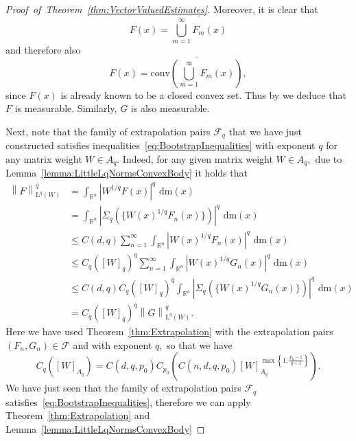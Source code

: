 \documentclass{article}
\theoremstyle{definition}
\theoremstyle{remark}
\numberwithin{equation}{section}
\newcommand{\norm}[2]{\left\|{#1}\right\|_{{#2}}}
\newcommand{\mathdm}{\,\mathrm{dm}}
\newcommand{\cF}{\mathcal{F}}
\newcommand{\reals}{\mathbb{R}}
\newcommand{\Lp}[1]{\mathrm{L}^{#1}}
\newcommand{\1}{\mathbf{1}}
\begin{document}
\begin{proof}[Proof~of~Theorem~\ref{thm:VectorValuedEstimates}]
        Moreover, it is clear that
        \begin{equation*}
            F(x) = \overline{\bigcup_{m=1}^{\infty}F_m(x)}
        \end{equation*}
        and therefore also
        \begin{equation*}
            F(x) = \overline{\mathrm{conv}\left(\bigcup_{m=1}^{\infty}F_{m}(x)\right)},
        \end{equation*}
        since $F(x)$ is already known to be a closed convex set. Thus by \cite[Theorem 8.2.2]{Aubin_2009} we deduce that $F$ is measurable. Similarly, $G$ is also measurable.

        Next, note that the family of extrapolation pairs $\cF_q$ that we have just constructed
        satisfies inequalities~\eqref{eq:BootstrapInequalities} with exponent $q$ for any matrix weight $W \in A_q.$
        Indeed, for any given matrix weight $W \in A_q,$ due to Lemma~\ref{lemma:LittleLqNormsConvexBody} it holds that
        \begin{equation*}
            \begin{split}
                \norm{F}{\Lp{q}(W)}^q &= \int_{\reals^n} |W^{1/q}F(x)|^q\, \mathdm(x)\\
                &= \int_{\reals^n} \left|\Sigma_q (\{W(x)^{1/q} F_n(x)\})\right|^q\, \mathdm(x)\\
                &\leq C(d,q) \sum_{n=1}^\infty \int_{\reals^n} |W(x)^{1/q} F_n(x)|^q\, \mathdm(x)\\
                &\leq C_{q}([W]_q)^q \sum_{n=1}^\infty \int_{\reals^n} |W(x)^{1/q} G_n(x)|^q\, \mathdm(x)\\
                &\leq C(d,q) C_{q}([W]_q)^q \int_{\reals^n} \left|\Sigma_q (\{W(x)^{1/q} G_n(x)\})\right|^q\, \mathdm(x)\\
                &= C_{q}([W]_q)^q \norm{G}{\Lp{q}(W)}^q.
            \end{split}
        \end{equation*}
        Here we have used Theorem~\ref{thm:Extrapolation} with the extrapolation pairs $(F_n,G_n) \in \cF$
        and with exponent $q,$ so that we have
        \begin{equation*}
            C_q([W]_{A_q}) = C(d,q,p_0) C_{p_0}\left(C(n,d,q,p_0) [W]_{A_q}^{\max\left\{1,\frac{p_0-1}{q-1}\right\}}\right).
        \end{equation*}
        We have just seen that the family of extrapolation pairs $\cF_q$ satisfies~\eqref{eq:BootstrapInequalities},
        therefore we can apply Theorem~\ref{thm:Extrapolation} and Lemma~\ref{lemma:LittleLqNormsConvexBody}

\end{proof}
\end{document}
